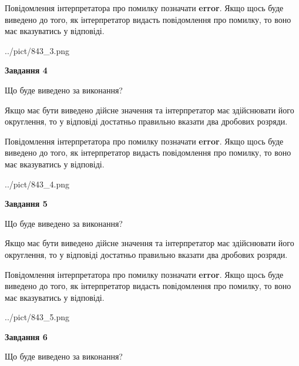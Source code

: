 \documentclass[12pt, ukrainian]{article}
\begin{document}
{\begin {Large}
Повідомлення інтерпретатора про помилку позначати \textbf{error}.
Якщо щось буде виведено до того, як інтерпретатор видасть повідомлення про помилку, 
то воно має вказуватись у відповіді. \par

\begin{center}
	{../pict/843_3.png}
\end{center}
\newpage

{\begin {center}\textbf{Завдання 4}\end {center}}\par
Що буде виведено за виконання? \par

Якщо має бути виведено дійсне значення та інтерпретатор має здійснювати його округлення, 
то у відповіді достатньо правильно вказати два дробових розряди.

Повідомлення інтерпретатора про помилку позначати \textbf{error}.
Якщо щось буде виведено до того, як інтерпретатор видасть повідомлення про помилку, 
то воно має вказуватись у відповіді. \par

\begin{center}
	{../pict/843_4.png}
\end{center}
\newpage

{\begin {center}\textbf{Завдання 5}\end {center}}\par
Що буде виведено за виконання? \par

Якщо має бути виведено дійсне значення та інтерпретатор має здійснювати його округлення, 
то у відповіді достатньо правильно вказати два дробових розряди.

Повідомлення інтерпретатора про помилку позначати \textbf{error}.
Якщо щось буде виведено до того, як інтерпретатор видасть повідомлення про помилку, 
то воно має вказуватись у відповіді. \par

\begin{center}
	{../pict/843_5.png}
\end{center}
\newpage

{\begin {center}\textbf{Завдання 6}\end {center}}\par
Що буде виведено за виконання? \par


\end{Large}}
\end{document}
